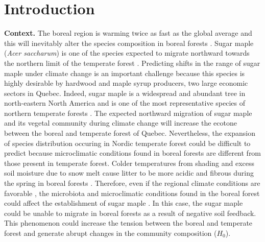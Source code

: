 


\newpage
\setcounter{page}{1}

\section{Introduction}

\textbf{Context.}  The boreal region is warming twice as fast as the global
average and  this will inevitably alter the species composition in boreal
forests \cite{Scheffer2012,Hughes2000}.  Sugar maple (\textit{Acer saccharum})
is one of the species expected to migrate northward towards the northern limit
of the temperate forest \cite{McKENNEY2007,Goldblum2005}. Predicting shifts in
the range of sugar maple under climate change is an important challenge
because this species is highly desirable by hardwood and maple syrup
producers, two large economic sectors in Quebec. Indeed, sugar maple is a
widespread and abundant tree in north-eastern North America and is one of the
most representative species of northern temperate forests
\cite{Graignic2013,Messaoud2007,Kellman2004,Barras1998}. The expected
northward migration of sugar maple and its vegetal community during climate
change will increase the ecotone between the boreal and temperate forest of
Quebec. Nevertheless, the expansion of species distribution occuring in Nordic
temperate forest could be difficult to predict because microclimatic
conditions found in boreal forests are different from those present in
temperate forest. Colder temperatures from shading and excess soil moisture
due to snow melt cause litter to be more acidic and fibrous during the spring
in boreal forests . Therefore, even if the regional climate conditions are
favorable \cite{Kellman2004}, the microbiota and microclimatic conditions
found in the boreal forest could affect the establishment of sugar maple
\cite{Kellman2004,Moore2008,DeFrenne2013,Barras1998}. In this case, the sugar
maple could be unable to migrate in boreal forests as a result of negative
soil feedback. This phenomenon could increase the tension between the boreal
and temperate forest and generate abrupt changes in the community composition
(\textbf{$H_0$}).\\

